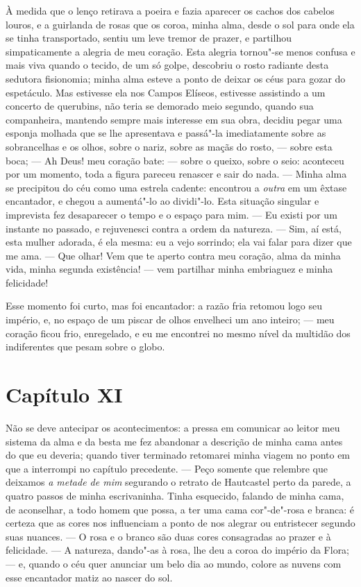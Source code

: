  À medida que o lenço retirava a poeira e fazia aparecer os cachos dos
cabelos louros, e a guirlanda de rosas que os coroa, minha alma, desde
o sol para onde ela se tinha transportado, sentiu um leve tremor de
prazer, e partilhou simpaticamente a alegria de meu coração. Esta
alegria tornou"-se menos confusa e mais viva quando o tecido, de um só
golpe, descobriu o rosto radiante desta sedutora fisionomia; minha alma
esteve a ponto de deixar os céus para gozar do espetáculo. Mas
estivesse ela nos Campos Elíseos, estivesse assistindo a um concerto de
querubins, não teria se demorado meio segundo, quando sua companheira,
mantendo sempre mais interesse em sua obra, decidiu pegar uma esponja
molhada que se lhe apresentava e passá"-la imediatamente sobre as
sobrancelhas e os olhos, sobre o nariz, sobre as maçãs do rosto, ---
sobre esta boca; --- Ah Deus! meu coração bate: --- sobre o queixo,
sobre o seio: aconteceu por um momento, toda a figura pareceu renascer
e sair do nada. --- Minha alma se precipitou do céu como uma estrela
cadente: encontrou a \textit{outra} em um êxtase encantador, e chegou a
aumentá"-lo ao dividi"-lo. Esta situação singular e imprevista fez
desaparecer o tempo e o espaço para mim. --- Eu existi por um instante
no passado, e rejuvenesci contra a ordem da natureza. --- Sim, aí está,
esta mulher adorada, é ela mesma: eu a vejo sorrindo; ela vai falar
para dizer que me ama. --- Que olhar! Vem que te aperto contra meu
coração, alma da minha vida, minha segunda existência! --- vem
partilhar minha embriaguez e minha felicidade!

 Esse momento foi curto, mas foi encantador: a razão fria retomou logo
seu império, e, no espaço de um piscar de olhos envelheci um ano
inteiro; --- meu coração ficou frio, enregelado, e eu me encontrei no
mesmo nível da multidão dos indiferentes que pesam sobre o globo.

\section*{Capítulo XI}

 Não se deve antecipar os acontecimentos: a pressa em comunicar ao
leitor meu sistema da alma e da besta me fez abandonar a descrição de
minha cama antes do que eu deveria; quando tiver terminado retomarei
minha viagem no ponto em que a interrompi no capítulo precedente. ---
Peço somente que relembre que deixamos \textit{a metade de mim}
segurando o retrato de Hautcastel perto da parede, a quatro passos de
minha escrivaninha. Tinha esquecido, falando de minha cama, de
aconselhar, a todo homem que possa, a ter uma cama cor"-de"-rosa e
branca: é certeza que as cores nos influenciam a ponto de nos alegrar
ou entristecer segundo suas nuances. --- O rosa e o branco são duas
cores consagradas ao prazer e à felicidade. --- A natureza, dando"-as à
rosa, lhe deu a coroa do império da Flora; --- e, quando o céu quer
anunciar um belo dia ao mundo, colore as nuvens com esse encantador
matiz ao nascer do sol.

